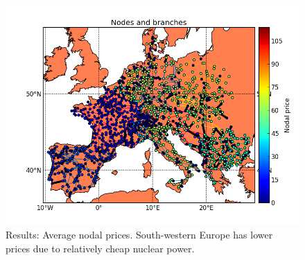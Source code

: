 \documentclass{article}
\begin{document}
\begin{figure}
\centering
\includegraphics[scale=0.6]{example_2w_map_nodalprices.png}
\caption{Results: Average nodal prices. South-western Europe has lower prices due to relatively cheap nuclear power. }
\label{fig:example_map_prices}
\end{figure}



\newpage
\appendix




%
%

\end{document}
